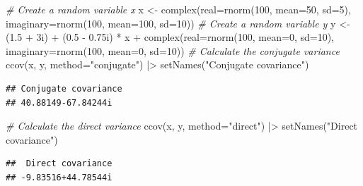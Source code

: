 \documentclass[
]{book}
\newenvironment{Shaded}{\begin{snugshade}}{\end{snugshade}}
\newcommand{\AttributeTok}[1]{\textcolor[rgb]{0.77,0.63,0.00}{#1}}
\newcommand{\CommentTok}[1]{\textcolor[rgb]{0.56,0.35,0.01}{\textit{#1}}}
\newcommand{\DecValTok}[1]{\textcolor[rgb]{0.00,0.00,0.81}{#1}}
\newcommand{\FloatTok}[1]{\textcolor[rgb]{0.00,0.00,0.81}{#1}}
\newcommand{\FunctionTok}[1]{\textcolor[rgb]{0.00,0.00,0.00}{#1}}
\newcommand{\NormalTok}[1]{#1}
\newcommand{\OtherTok}[1]{\textcolor[rgb]{0.56,0.35,0.01}{#1}}
\newcommand{\SpecialCharTok}[1]{\textcolor[rgb]{0.00,0.00,0.00}{#1}}
\newcommand{\StringTok}[1]{\textcolor[rgb]{0.31,0.60,0.02}{#1}}
\begin{document}
\begin{Shaded}
\begin{Highlighting}[]
\CommentTok{\# Create a random variable x}
\NormalTok{x }\OtherTok{\textless{}{-}} \FunctionTok{complex}\NormalTok{(}\AttributeTok{real=}\FunctionTok{rnorm}\NormalTok{(}\DecValTok{100}\NormalTok{, }\AttributeTok{mean=}\DecValTok{50}\NormalTok{, }\AttributeTok{sd=}\DecValTok{5}\NormalTok{),}
             \AttributeTok{imaginary=}\FunctionTok{rnorm}\NormalTok{(}\DecValTok{100}\NormalTok{, }\AttributeTok{mean=}\DecValTok{100}\NormalTok{, }\AttributeTok{sd=}\DecValTok{10}\NormalTok{))}
\CommentTok{\# Create a random variable y}
\NormalTok{y }\OtherTok{\textless{}{-}}\NormalTok{ (}\FloatTok{1.5} \SpecialCharTok{+}\NormalTok{ 3i) }\SpecialCharTok{+}\NormalTok{ (}\FloatTok{0.5} \SpecialCharTok{{-}} \FloatTok{0.75}\NormalTok{i) }\SpecialCharTok{*}\NormalTok{ x }\SpecialCharTok{+}
            \FunctionTok{complex}\NormalTok{(}\AttributeTok{real=}\FunctionTok{rnorm}\NormalTok{(}\DecValTok{100}\NormalTok{, }\AttributeTok{mean=}\DecValTok{0}\NormalTok{, }\AttributeTok{sd=}\DecValTok{10}\NormalTok{),}
                    \AttributeTok{imaginary=}\FunctionTok{rnorm}\NormalTok{(}\DecValTok{100}\NormalTok{, }\AttributeTok{mean=}\DecValTok{0}\NormalTok{, }\AttributeTok{sd=}\DecValTok{10}\NormalTok{))}
\CommentTok{\# Calculate the conjugate variance}
\FunctionTok{ccov}\NormalTok{(x, y, }\AttributeTok{method=}\StringTok{"conjugate"}\NormalTok{) }\SpecialCharTok{|\textgreater{}}
    \FunctionTok{setNames}\NormalTok{(}\StringTok{"Conjugate covariance"}\NormalTok{)}
\end{Highlighting}
\end{Shaded}

\begin{verbatim}
## Conjugate covariance 
## 40.88149-67.84244i
\end{verbatim}

\begin{Shaded}
\begin{Highlighting}[]
\CommentTok{\# Calculate the direct variance}
\FunctionTok{ccov}\NormalTok{(x, y, }\AttributeTok{method=}\StringTok{"direct"}\NormalTok{) }\SpecialCharTok{|\textgreater{}}
    \FunctionTok{setNames}\NormalTok{(}\StringTok{"Direct covariance"}\NormalTok{)}
\end{Highlighting}
\end{Shaded}

\begin{verbatim}
##  Direct covariance 
## -9.83516+44.78544i
\end{verbatim}
\end{document}
